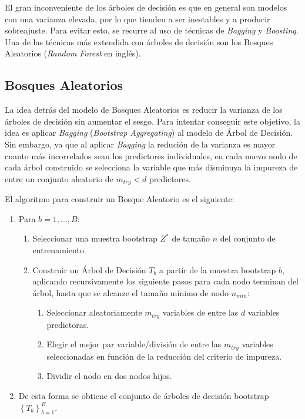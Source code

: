 \documentclass[12pt,a4paper,]{book}
\providecommand{\tightlist}{%
  \setlength{\itemsep}{0pt}\setlength{\parskip}{0pt}}
\numberwithin{dummy}{section}
\theoremstyle{ocrenumbox}
\theoremstyle{blacknumex}
\theoremstyle{blacknumbox}
\theoremstyle{ocrenum}
\theoremstyle{ocrenum}
\begin{document}
El gran inconveniente de los árboles de decisión es que en general son
modelos con una varianza elevada, por lo que tienden a ser inestables y
a producir sobreajuste. Para evitar esto, se recurre al uso de técnicas
de \emph{Bagging} y \emph{Boosting}. Una de las técnicas más extendida
con árboles de decisión son los Bosques Aleatorios (\emph{Random Forest}
en inglés).

\hypertarget{bosques-aleatorios}{%
\subsection{Bosques Aleatorios}\label{bosques-aleatorios}}

La idea detrás del modelo de Bosques Aleatorios es reducir la varianza
de los árboles de decisión sin aumentar el sesgo. Para intentar
conseguir este objetivo, la idea es aplicar \emph{Bagging}
(\emph{Bootstrap Aggregating}) al modelo de Árbol de Decisión. Sin
embargo, ya que al aplicar \emph{Bagging} la redución de la varianza es
mayor cuanto más incorrelados sean los predictores individuales, en cada
nuevo nodo de cada árbol construido se selecciona la variable que más
disminuya la impureza de entre un conjunto aleatorio de \(m_{try} < d\)
predictores.

El algoritmo para construir un Bosque Aleatorio es el siguiente:

\begin{enumerate}
\def\labelenumi{\arabic{enumi}.}
\item
  Para \(b = {1,...,B}:\)

  \begin{enumerate}
  \def\labelenumii{\alph{enumii})}
  \item
    Seleccionar una muestra bootstrap \(Z^*\) de tamaño \(n\) del
    conjunto de entrenamiento.
  \item
    Construir un Árbol de Decisión \(T_b\) a partir de la muestra
    bootstrap \(b\), aplicando recursivamente los siguiente pasos para
    cada nodo terminan del árbol, hasta que se alcanze el tamaño mínimo
    de nodo \(n_{min}:\)

    \begin{enumerate}
    \def\labelenumiii{\roman{enumiii}.}
    \tightlist
    \item
      Seleccionar aleatoriamente \(m_{try}\) variables de entre las
      \(d\) variables predictoras.
    \item
      Elegir el mejor par variable/división de entre las \(m_{try}\)
      variables seleccionadas en función de la reducción del criterio de
      impureza.
    \item
      Dividir el nodo en dos nodos hijos.
    \end{enumerate}
  \end{enumerate}
\item
  De esta forma se obtiene el conjunto de árboles de decisión bootstrap
  \(\left\{ T_b \right\}_{b=1}^B\).
\end{enumerate}
\end{document}
